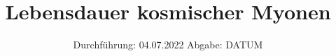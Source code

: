 

\subject{V01}
\title{Lebensdauer kosmischer Myonen}
\date{%
  Durchführung: 04.07.2022
  \hspace{3em}
  Abgabe: DATUM
}



\maketitle
\thispagestyle{empty}
\tableofcontents
\newpage



% 
% 
% 

\nocite{*}
\printbibliography{}


